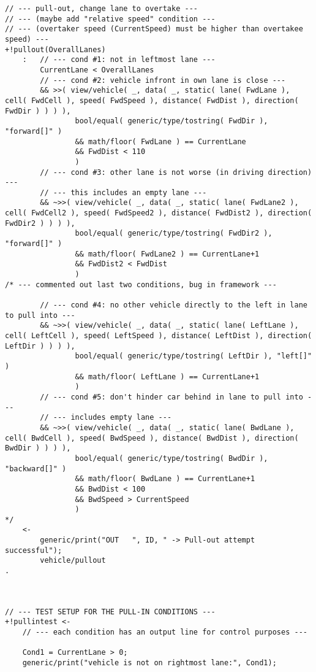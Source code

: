 \begin{lstlisting}
// --- pull-out, change lane to overtake ---
// --- (maybe add "relative speed" condition ---
// --- (overtaker speed (CurrentSpeed) must be higher than overtakee speed) ---
+!pullout(OverallLanes)
    :   // --- cond #1: not in leftmost lane ---
        CurrentLane < OverallLanes 
        // --- cond #2: vehicle infront in own lane is close ---
        && >>( view/vehicle( _, data( _, static( lane( FwdLane ), cell( FwdCell ), speed( FwdSpeed ), distance( FwdDist ), direction( FwdDir ) ) ) ),
                bool/equal( generic/type/tostring( FwdDir ), "forward[]" ) 
                && math/floor( FwdLane ) == CurrentLane
                && FwdDist < 110 
                )
        // --- cond #3: other lane is not worse (in driving direction) ---
        // --- this includes an empty lane ---
        && ~>>( view/vehicle( _, data( _, static( lane( FwdLane2 ), cell( FwdCell2 ), speed( FwdSpeed2 ), distance( FwdDist2 ), direction( FwdDir2 ) ) ) ),
                bool/equal( generic/type/tostring( FwdDir2 ), "forward[]" ) 
                && math/floor( FwdLane2 ) == CurrentLane+1
                && FwdDist2 < FwdDist 
                )
/* --- commented out last two conditions, bug in framework --- 

        // --- cond #4: no other vehicle directly to the left in lane to pull into ---
        && ~>>( view/vehicle( _, data( _, static( lane( LeftLane ), cell( LeftCell ), speed( LeftSpeed ), distance( LeftDist ), direction( LeftDir ) ) ) ),
                bool/equal( generic/type/tostring( LeftDir ), "left[]" ) 
                && math/floor( LeftLane ) == CurrentLane+1
                )
        // --- cond #5: don't hinder car behind in lane to pull into ---
        // --- includes empty lane ---
        && ~>>( view/vehicle( _, data( _, static( lane( BwdLane ), cell( BwdCell ), speed( BwdSpeed ), distance( BwdDist ), direction( BwdDir ) ) ) ),
                bool/equal( generic/type/tostring( BwdDir ), "backward[]" ) 
                && math/floor( BwdLane ) == CurrentLane+1
                && BwdDist < 100
                && BwdSpeed > CurrentSpeed 
                )
*/
    <-
        generic/print("OUT   ", ID, " -> Pull-out attempt successful");
        vehicle/pullout
.



// --- TEST SETUP FOR THE PULL-IN CONDITIONS ---
+!pullintest <-
    // --- each condition has an output line for control purposes ---

    Cond1 = CurrentLane > 0;
    generic/print("vehicle is not on rightmost lane:", Cond1);


\end{lstlisting}
